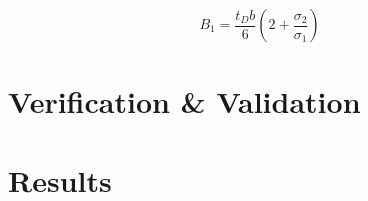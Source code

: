 \begin{equation}
\label{eq:boom}
    B_{1} = \frac{t_{D}b}{6}\left ( 2+\frac{\sigma _{2}}{\sigma _{1}} \right )
\end{equation}

\section{Verification \& Validation}
\label{sec:veri_vali}
\section{Results}
\label{sec:resu_stru}
\begin{comment}
In this section, the fuselage and payload compartment design will be explained. First, the layout of the fuselage is presented. Based on this, a stress analysis is made. After that, different options for materials are compared. Finally, all design decisions, based on the previous analysis, are presented.


\section{Fuselage Layout}
\label{sec:fuse_layo}
Explain general layout of the fuselage, like where the torsion boxes, stringers etc will be located


\section{Stress Analysis}
\label{sec:stre_anal}




\section{Material Analysis}%
\label{sec:mate_anal}

In this section, an overview is given of different materials that could possibly be used to manufacture the UAV. Some relative qualities are presented for each material option. In \autoref{tab:mate_gene} all materials that contribute to the strength of the structure are given. In \autoref{tab:mate_clos} the possible materials for the payload bay closing system that do not contribute to the stress bearing capacities are compared. The cost is not discussed in these tables, since for the expected quantity of products, fibre reinforced composites can compete with steel\footnotemark.
\footnotetext{\url{http://msl1.mit.edu/MIB/3.57/LectNotes/gm_tech_composites.pdf}, Accessed 14-06-2017}




\end{comment}
